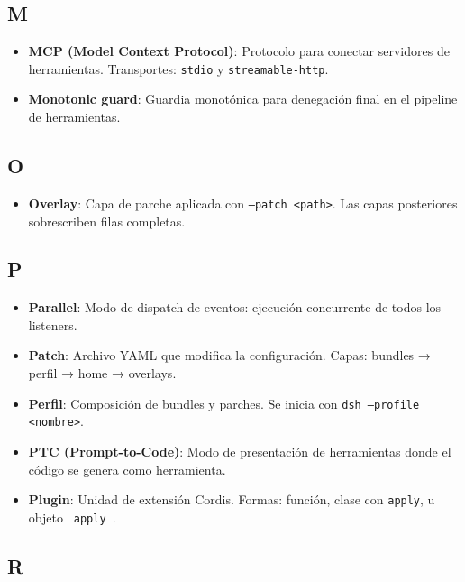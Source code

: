 \documentclass[11pt,a4paper]{article}
\begin{document}
\subsection*{M}


\begin{itemize}[leftmargin=*,topsep=2pt,itemsep=1pt]
  \item \textbf{MCP (Model Context Protocol)}: Protocolo para conectar servidores de herramientas. Transportes: \texttt{stdio} y \texttt{streamable-http}.
  \item \textbf{Monotonic guard}: Guardia monotónica para denegación final en el pipeline de herramientas.
\end{itemize}


\subsection*{O}


\begin{itemize}[leftmargin=*,topsep=2pt,itemsep=1pt]
  \item \textbf{Overlay}: Capa de parche aplicada con \texttt{--patch <path>}. Las capas posteriores sobrescriben filas completas.
\end{itemize}


\subsection*{P}


\begin{itemize}[leftmargin=*,topsep=2pt,itemsep=1pt]
  \item \textbf{Parallel}: Modo de dispatch de eventos: ejecución concurrente de todos los listeners.
  \item \textbf{Patch}: Archivo YAML que modifica la configuración. Capas: bundles → perfil → home → overlays.
  \item \textbf{Perfil}: Composición de bundles y parches. Se inicia con \texttt{dsh --profile <nombre>}.
  \item \textbf{PTC (Prompt-to-Code)}: Modo de presentación de herramientas donde el código se genera como herramienta.
  \item \textbf{Plugin}: Unidad de extensión Cordis. Formas: función, clase con \texttt{apply}, u objeto \texttt{{ apply }}.
\end{itemize}


\subsection*{R}
\end{document}
